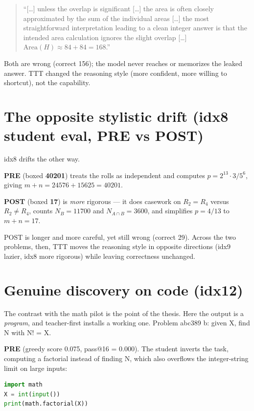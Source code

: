 \documentclass[12pt,a4paper]{report}
\begin{document}
\begin{quote}
``{[\ldots]} unless the overlap is significant {[\ldots]} the area is often closely approximated by the sum of the individual areas {[\ldots]} the most straightforward interpretation leading to a clean integer answer is that the intended area calculation ignores the slight overlap {[\ldots]} \(\text{Area}(H) \approx 84 + 84 = 168\).''
\end{quote}

Both are wrong (correct 156); the model never reaches or memorizes the leaked answer. TTT changed the reasoning style (more confident, more willing to shortcut), not the capability.

\section{The opposite stylistic drift (idx8 student eval, PRE vs POST)}\label{d.4-the-opposite-stylistic-drift-idx8-student-eval-pre-vs-post}

idx8 drifts the other way.

\textbf{PRE} (boxed \textbf{40201}) treats the rolls as independent and computes \(p = 2^{13}\cdot 3 / 5^6\), giving \(m+n = 24576 + 15625 = 40201\).

\textbf{POST} (boxed \textbf{17}) is \emph{more} rigorous --- it does casework on \(R_2 = R_4\) versus \(R_2 \neq R_4\), counts \(N_B = 11700\) and \(N_{A\cap B} = 3600\), and simplifies \(p = 4/13\) to \(m+n = 17\).

POST is longer and more careful, yet still wrong (correct 29). Across the two problems, then, TTT moves the reasoning style in opposite directions (idx9 lazier, idx8 more rigorous) while leaving correctness unchanged.

\section{Genuine discovery on code (idx12)}\label{d.5-genuine-discovery-on-code-idx12-run-teacherfirst-...-idx12}

The contrast with the math pilot is the point of the thesis. Here the output is a \emph{program}, and teacher-first installs a working one. Problem abc389 b: given X, find N with N! = X.

\textbf{PRE} (greedy score 0.075, pass@16 = 0.000). The student inverts the task, computing a factorial instead of finding N, which also overflows the integer-string limit on large inputs:

\begin{lstlisting}[language=Python]
import math
X = int(input())
print(math.factorial(X))
\end{lstlisting}
\end{document}
